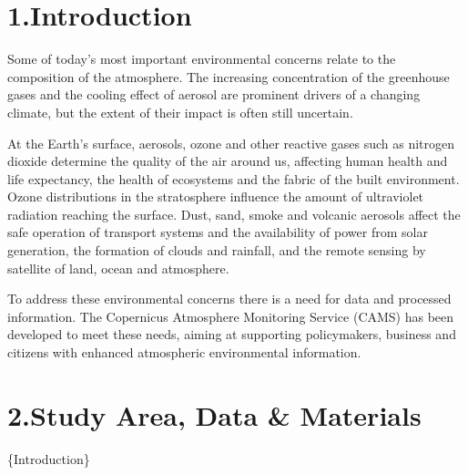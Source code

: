 \documentclass[9pt]{report}
\begin{document}
\mdxtitleblockstart{}
\mdxauthorstart{}
\mdxauthorend\mdtitleauthorrunning{}{}\mdxtitleblockend%

\section{1.\hspace*{0.5em}Introduction}\label{sec-introduction}%

\noindent{}Some of today’s most important environmental concerns relate to the 
composition of the atmosphere. The increasing concentration of the 
greenhouse gases and the cooling effect of aerosol are prominent 
drivers of a changing climate, but the extent of their impact is 
often still uncertain.%

At the Earth’s surface, aerosols, ozone and other reactive gases such as 
nitrogen dioxide determine the quality of the air around us, affecting 
human health and life expectancy, the health of ecosystems and the 
fabric of the built environment. Ozone distributions in the stratosphere 
influence the amount of ultraviolet radiation reaching the surface. 
Dust, sand, smoke and volcanic aerosols affect the safe operation of 
transport systems and the availability of power from solar generation, 
the formation of clouds and rainfall, and the remote sensing by satellite 
of land, ocean and atmosphere.%

To address these environmental concerns there is a need for data and 
processed information. The Copernicus Atmosphere Monitoring Service (CAMS) 
has been developed to meet these needs, aiming at supporting policymakers, 
business and citizens with enhanced atmospheric environmental information.%

\section{2.\hspace*{0.5em}Study Area, Data \& Materials}\label{sec-study-area-data-materials}%

\noindent{}\{Introduction\}%
\end{document}
